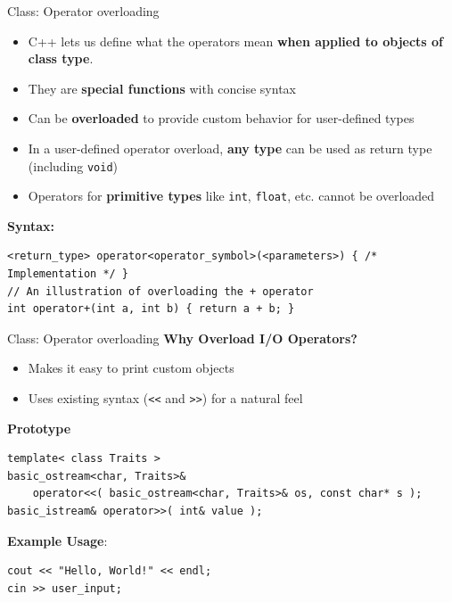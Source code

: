 \begin{frame}[fragile]{Class: Operator overloading}
	\begin{itemize}
		\item C++ lets us define what the operators mean \textbf{when applied to objects of class type}.
		\item They are \textbf{special functions} with concise syntax
		\item Can be \textbf{overloaded} to provide custom behavior for user-defined types
		\item In a user-defined operator overload, \textbf{any type} can be used as return type (including \texttt{void})
		\item Operators for \textbf{primitive types} like \texttt{int}, \texttt{float}, etc. cannot be overloaded
	\end{itemize}

	\textbf{Syntax:}
	\begin{verbatim}
<return_type> operator<operator_symbol>(<parameters>) { /* Implementation */ }
// An illustration of overloading the + operator
int operator+(int a, int b) { return a + b; }
    \end{verbatim}
\end{frame}

\begin{frame}[fragile]{Class: Operator overloading}
	\textbf{Why Overload I/O Operators?}
	\begin{itemize}
		\item Makes it easy to print custom objects
		\item Uses existing syntax (\texttt{<<} and \texttt{>>}) for a natural feel
	\end{itemize}

	\textbf{Prototype}
	\begin{verbatim}
template< class Traits >
basic_ostream<char, Traits>&
    operator<<( basic_ostream<char, Traits>& os, const char* s );
basic_istream& operator>>( int& value );
    \end{verbatim}
	\textbf{Example Usage}:
	\begin{verbatim}
cout << "Hello, World!" << endl;
cin >> user_input;
    \end{verbatim}
\end{frame}

